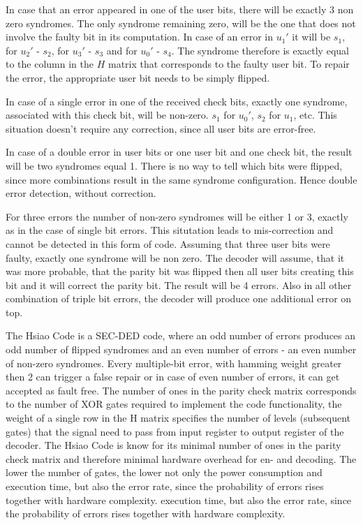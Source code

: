 In case that an error appeared in one of the user bits, there will be exactly 3 non zero syndromes. The only syndrome remaining zero, will be the one that does not involve the faulty bit in its computation. In case of an error in $u_1'$ it will be $s_1$, for $u_2'$ - $s_2$, for $u_3'$ - $s_3$ and for $u_0'$ - $s_4$. The syndrome therefore is exactly equal to the column in the $H$ matrix that corresponds to the faulty user bit. To repair the error, the appropriate user bit needs to be simply flipped.

In case of a single error in one of the received check bits, exactly one syndrome, associated with this check bit, will be non-zero. $s_1$ for $u_0'$, $s_2$ for $u_1$, etc. This situation doesn't require any correction, since all user bits are error-free. 

In case of a double error in user bits or one user bit and one check bit, the result will be two syndromes equal 1. There is no way to tell which bits were flipped, since more combinations result in the same syndrome configuration. Hence double error detection, without correction.

For three errors the number of non-zero syndromes will be either 1 or 3, exactly as in the case of single bit errors. This situtation leads to mis-correction and cannot be detected in this form of code. Assuming that three user bits were faulty, exactly one syndrome will be non zero. The decoder will assume, that it was more probable, that the parity bit was flipped then all user bits creating this bit and it will correct the parity bit. The result will be 4 errors. Also in all other combination of triple bit errors, the decoder will produce one additional error on top.

The Hsiao Code is a SEC-DED code, where an odd number of errors produces an odd number of flipped syndromes and an even number of errors - an even number of non-zero syndromes. Every multiple-bit error, with hamming weight greater then 2 can trigger a false repair or in case of even number of errors, it can get accepted as fault free. The number of ones in the parity check matrix corresponds to the number of XOR gates required to implement the code functionality, the weight of a single row in the H matrix specifies the number of levels (subsequent gates) that the signal need to pass from input register to output register of the decoder. The Hsiao Code is know for its minimal number of ones in the parity check matrix and therefore minimal hardware overhead for en- and decoding. The lower the number of gates, the lower not only the power consumption and execution time, but also the error rate, since the probability of errors rises together with hardware complexity.
execution time, but also the error rate, since the probability of errors rises together with hardware complexity.

